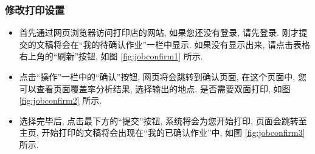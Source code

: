 \documentclass{article}
\begin{document}
\begin{CJK}{UTF8}{gbsn}
		\subsubsection{修改打印设置}
			\begin{itemize}
				\item{首先通过网页浏览器访问打印店的网站, 如果您还没有登录, 请先登录. 刚才提交的文稿将会在``我的待确认作业''一栏中显示. 如果没有显示出来, 请点击表格右上角的``刷新''按钮, 如图 \ref{fig:jobconfirm1} 所示.}
				\item{点击``操作''一栏中的``确认''按钮, 网页将会跳转到确认页面, 在这个页面中, 您可以查看页面覆盖率分析结果, 选择输出的地点, 是否需要双面打印, 如图 \ref{fig:jobconfirm2} 所示.}
				\item{选择完毕后, 点击最下方的``提交''按钮, 系统将会为您开始打印, 页面会跳转至主页, 开始打印的文稿将会出现在``我的已确认作业''中, 如图 \ref{fig:jobconfirm3} 所示.}
			\end{itemize}
			

\end{CJK}
\end{document}
